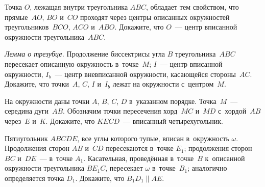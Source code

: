 \begin{problems}

\item
Точка $O$, лежащая внутри треугольника $ABC$, обладает тем свойством, что
прямые~$AO$, $BO$ и~$CO$ проходят через центры описанных окружностей
треугольников~$BCO$, $ACO$ и~$ABO$.
Докажите, что $O$~--- центр вписанной окружности треугольника~$ABC$.

\item\emph{Лемма о трезубце.}
Продолжение биссектрисы угла $B$ треугольника~$ABC$ пересекает описанную
окружность в~точке~$M$; $I$~--- центр вписанной окружности, $I_b$~--- центр
вневписанной окружности, касающейся стороны~$AC$.
Докажите, что точки~$A$, $C$, $I$ и~$I_b$ лежат на окружности с~центром~$M$.

\item
На окружности даны точки $A$, $B$, $C$, $D$ в~указанном порядке.
Точка~$M$~--- середина дуги~$AB$.
Обозначим точки пересечения хорд~$MC$ и~$MD$ с~хордой~$AB$ через~$E$ и~$K$.
Докажите, что $KECD$~--- вписанный четырехугольник.

\item
Пятиугольник $ABCDE$, все углы которого тупые, вписан в~окружность $\omega$.
Продолжения сторон $AB$ и~$CD$ пересекаются в~точке $E_1$;
продолжения сторон $BC$ и~$DE$~--- в~точке $A_1$.
Касательная, проведённая в~точке~$B$ к~описанной окружности треугольника
$B E_1 C$, пересекает $\omega$ в~точке~$B_1$;
аналогично определяется точка $D_1$.
Докажите, что  $B_1 D_1 \parallel AE$.
\end{problems}

